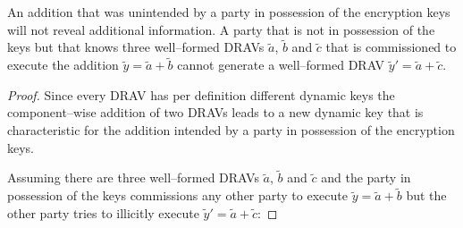 \begin{lem}
  \label{lem:wrong-add}

  An addition that was unintended by a party in possession of the encryption
  keys will not reveal additional information. A party that is not in possession
  of the keys but that knows three well--formed DRAVs $\widetilde{a}$,
  $\widetilde{b}$ and $\widetilde{c}$ that is commissioned to execute the
  addition $\widetilde{y} = \widetilde{a} + \widetilde{b}$ cannot generate a
  well--formed DRAV $\widetilde{y}' = \widetilde{a} + \widetilde{c}$.

\end{lem}

\begin{proof}

  Since every DRAV has per definition different dynamic keys the
  component--wise addition of two DRAVs leads to a new dynamic key that is
  characteristic for the addition intended by a party in possession of the
  encryption keys.

  Assuming there are three well--formed DRAVs $\widetilde{a}$, $\widetilde{b}$
  and $\widetilde{c}$ and the party in possession of the keys commissions any
  other party to execute $\widetilde{y} = \widetilde{a} + \widetilde{b}$ but the
  other party tries to illicitly execute $\widetilde{y}' = \widetilde{a} +
  \widetilde{c}$:


\end{proof}
